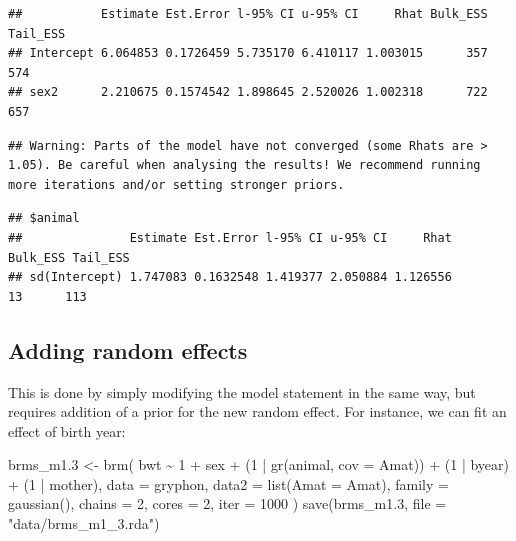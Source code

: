 \documentclass[
  12pt,
]{book}
\newenvironment{Shaded}{\begin{snugshade}}{\end{snugshade}}
\newcommand{\AttributeTok}[1]{\textcolor[rgb]{0.77,0.63,0.00}{#1}}
\newcommand{\DecValTok}[1]{\textcolor[rgb]{0.00,0.00,0.81}{#1}}
\newcommand{\FloatTok}[1]{\textcolor[rgb]{0.00,0.00,0.81}{#1}}
\newcommand{\FunctionTok}[1]{\textcolor[rgb]{0.00,0.00,0.00}{#1}}
\newcommand{\NormalTok}[1]{#1}
\newcommand{\OtherTok}[1]{\textcolor[rgb]{0.56,0.35,0.01}{#1}}
\newcommand{\SpecialCharTok}[1]{\textcolor[rgb]{0.00,0.00,0.00}{#1}}
\newcommand{\StringTok}[1]{\textcolor[rgb]{0.31,0.60,0.02}{#1}}
\begin{document}
\begin{verbatim}
##           Estimate Est.Error l-95% CI u-95% CI     Rhat Bulk_ESS Tail_ESS
## Intercept 6.064853 0.1726459 5.735170 6.410117 1.003015      357      574
## sex2      2.210675 0.1574542 1.898645 2.520026 1.002318      722      657
\end{verbatim}

\begin{Shaded}
\end{Shaded}

\begin{verbatim}
## Warning: Parts of the model have not converged (some Rhats are > 1.05). Be careful when analysing the results! We recommend running more iterations and/or setting stronger priors.
\end{verbatim}

\begin{verbatim}
## $animal
##               Estimate Est.Error l-95% CI u-95% CI     Rhat Bulk_ESS Tail_ESS
## sd(Intercept) 1.747083 0.1632548 1.419377 2.050884 1.126556       13      113
\end{verbatim}

\hypertarget{adding-random-effects-2}{%
\subsection{Adding random effects}\label{adding-random-effects-2}}

This is done by simply modifying the model statement in the same way, but requires addition of a prior for the new random effect. For instance, we can fit an effect of birth year:

\begin{Shaded}
\begin{Highlighting}[]
\NormalTok{brms\_m1}\FloatTok{.3} \OtherTok{\textless{}{-}} \FunctionTok{brm}\NormalTok{(}
\NormalTok{  bwt }\SpecialCharTok{\textasciitilde{}} \DecValTok{1} \SpecialCharTok{+}\NormalTok{ sex }\SpecialCharTok{+}\NormalTok{ (}\DecValTok{1} \SpecialCharTok{|} \FunctionTok{gr}\NormalTok{(animal, }\AttributeTok{cov =}\NormalTok{ Amat)) }\SpecialCharTok{+}\NormalTok{ (}\DecValTok{1} \SpecialCharTok{|}\NormalTok{ byear) }\SpecialCharTok{+}\NormalTok{ (}\DecValTok{1} \SpecialCharTok{|}\NormalTok{ mother),}
  \AttributeTok{data =}\NormalTok{ gryphon,}
  \AttributeTok{data2 =} \FunctionTok{list}\NormalTok{(}\AttributeTok{Amat =}\NormalTok{ Amat),}
  \AttributeTok{family =} \FunctionTok{gaussian}\NormalTok{(),}
  \AttributeTok{chains =} \DecValTok{2}\NormalTok{, }\AttributeTok{cores =} \DecValTok{2}\NormalTok{, }\AttributeTok{iter =} \DecValTok{1000}
\NormalTok{)}
\FunctionTok{save}\NormalTok{(brms\_m1}\FloatTok{.3}\NormalTok{, }\AttributeTok{file =} \StringTok{"data/brms\_m1\_3.rda"}\NormalTok{)}
\end{Highlighting}
\end{Shaded}
\end{document}
